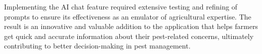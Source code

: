 Implementing the AI chat feature required extensive testing and refining of prompts to ensure its effectiveness as an emulator of agricultural expertise. The result is an innovative and valuable addition to the application that helps farmers get quick and accurate information about their pest-related concerns, ultimately contributing to better decision-making in pest management.
